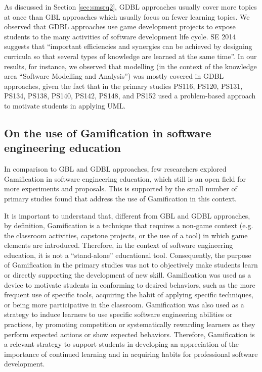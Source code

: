 As discussed in Section \ref{sec:smsrq2}, GDBL approaches usually cover more topics at once than GBL approaches which usually focus on fewer learning topics. We observed that GDBL approaches use game development projects to expose students to the many activities of software development life cycle. SE 2014 suggests that “important efficiencies and synergies can be achieved by designing curricula so that several types of knowledge are learned at the same time”. In our results, for instance, we observed that modelling (in the context of the knowledge area “Software Modelling and Analysis”) was mostly covered in GDBL approaches, given the fact that in the primary studies PS116, PS120, PS131, PS134, PS138, PS140, PS142, PS148, and PS152 used a problem-based approach to motivate students in applying UML.

\subsection{On the use of Gamification in software engineering education}
\label{sec:smsdiscussiongamification}

In comparison to GBL and GDBL approaches, few researchers explored Gamification in software engineering education, which still is an open field for more experiments and proposals. This is supported by the small number of primary studies found that address the use of Gamification in this context.

It is important to understand that, different from GBL and GDBL approaches, by definition, Gamification is a technique that requires a non-game context (e.g. the classroom activities, capstone projects, or the use of a tool) in which game elements are introduced. Therefore, in the context of software engineering education, it is not a “stand-alone” educational tool. Consequently, the purpose of Gamification in the primary studies was not to objectively make students learn or directly supporting the development of new skill. Gamification was used as a device to motivate students in conforming to desired behaviors, such as the more frequent use of specific tools, acquiring the habit of applying specific techniques, or being more participative in the classroom. Gamification was also used as a strategy to induce learners to use specific software engineering abilities or practices, by promoting competition or systematically rewarding learners as they perform expected actions or show expected behaviors. Therefore, Gamification is a relevant strategy to support students in developing an appreciation of the importance of continued learning and in acquiring habits for professional software development.

